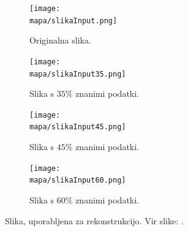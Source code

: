 \renewcommand{\mapa}{Poglavja/Slike/grayscale1000}

\begin{figure}[!ht]
    \centering
    \begin{subfigure}{0.49\linewidth}
        \texttt{[image: \\mapa/slikaInput.png]}
        \caption{Originalna slika.}
    \end{subfigure}
    \hfill
    \begin{subfigure}{0.49\linewidth}
        \texttt{[image: \\mapa/slikaInput35.png]}
        \caption{Slika s $35\%$ znanimi podatki.}
    \end{subfigure}
    \begin{subfigure}{0.49\linewidth}
        \texttt{[image: \\mapa/slikaInput45.png]}
        \caption{Slika s $45\%$ znanimi podatki.}
    \end{subfigure}
    \hfill
    \begin{subfigure}{0.49\linewidth}
        \texttt{[image: \\mapa/slikaInput60.png]}
        \caption{Slika s $60\%$ znanimi podatki.}
    \end{subfigure}
    \caption{Slika, uporabljena za rekonstrukcijo. Vir slike: \cite{UnsplashGora}.}
\end{figure}

